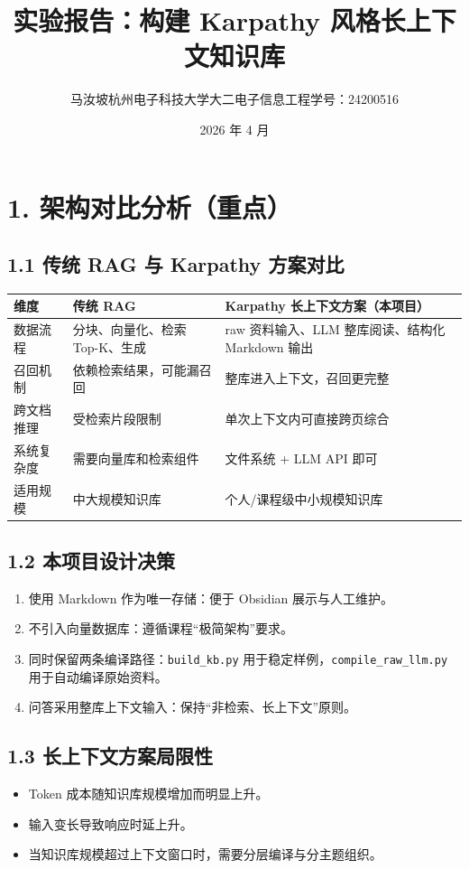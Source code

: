 \documentclass[UTF8]{ctexart}
\title{实验报告：构建 Karpathy 风格长上下文知识库}
\author{马汝坡\quad 杭州电子科技大学\quad 大二电子信息工程\quad 学号：24200516}
\date{2026 年 4 月}
\begin{document}
\maketitle

\section{1. 架构对比分析（重点）}
\subsection{1.1 传统 RAG 与 Karpathy 方案对比}
\begin{longtable}{p{}p{}p{}}
\toprule
维度 & 传统 RAG & Karpathy 长上下文方案（本项目） \\
\midrule
数据流程 & 分块、向量化、检索 Top-K、生成 & raw 资料输入、LLM 整库阅读、结构化 Markdown 输出 \\
召回机制 & 依赖检索结果，可能漏召回 & 整库进入上下文，召回更完整 \\
跨文档推理 & 受检索片段限制 & 单次上下文内可直接跨页综合 \\
系统复杂度 & 需要向量库和检索组件 & 文件系统 + LLM API 即可 \\
适用规模 & 中大规模知识库 & 个人/课程级中小规模知识库 \\
\bottomrule
\end{longtable}

\subsection{1.2 本项目设计决策}
\begin{enumerate}[leftmargin=1.5em]
\item 使用 Markdown 作为唯一存储：便于 Obsidian 展示与人工维护。
\item 不引入向量数据库：遵循课程“极简架构”要求。
\item 同时保留两条编译路径：\texttt{build\_kb.py} 用于稳定样例，\texttt{compile\_raw\_llm.py} 用于自动编译原始资料。
\item 问答采用整库上下文输入：保持“非检索、长上下文”原则。
\end{enumerate}

\subsection{1.3 长上下文方案局限性}
\begin{itemize}[leftmargin=1.5em]
\item Token 成本随知识库规模增加而明显上升。
\item 输入变长导致响应时延上升。
\item 当知识库规模超过上下文窗口时，需要分层编译与分主题组织。
\end{itemize}
\end{document}

